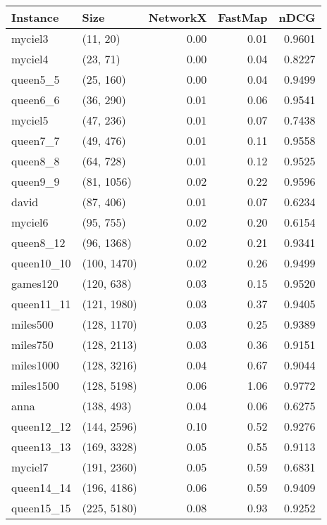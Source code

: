 \begin{tabular}{llrrr}
\toprule
  Instance &         Size &  NetworkX &  FastMap &   nDCG \\
\midrule
   myciel3 &     (11, 20) &      0.00 &     0.01 & 0.9601 \\
   myciel4 &     (23, 71) &      0.00 &     0.04 & 0.8227 \\
  queen5\_5 &    (25, 160) &      0.00 &     0.04 & 0.9499 \\
  queen6\_6 &    (36, 290) &      0.01 &     0.06 & 0.9541 \\
   myciel5 &    (47, 236) &      0.01 &     0.07 & 0.7438 \\
  queen7\_7 &    (49, 476) &      0.01 &     0.11 & 0.9558 \\
  queen8\_8 &    (64, 728) &      0.01 &     0.12 & 0.9525 \\
  queen9\_9 &   (81, 1056) &      0.02 &     0.22 & 0.9596 \\
     david &    (87, 406) &      0.01 &     0.07 & 0.6234 \\
   myciel6 &    (95, 755) &      0.02 &     0.20 & 0.6154 \\
 queen8\_12 &   (96, 1368) &      0.02 &     0.21 & 0.9341 \\
queen10\_10 &  (100, 1470) &      0.02 &     0.26 & 0.9499 \\
  games120 &   (120, 638) &      0.03 &     0.15 & 0.9520 \\
queen11\_11 &  (121, 1980) &      0.03 &     0.37 & 0.9405 \\
  miles500 &  (128, 1170) &      0.03 &     0.25 & 0.9389 \\
  miles750 &  (128, 2113) &      0.03 &     0.36 & 0.9151 \\
 miles1000 &  (128, 3216) &      0.04 &     0.67 & 0.9044 \\
 miles1500 &  (128, 5198) &      0.06 &     1.06 & 0.9772 \\
      anna &   (138, 493) &      0.04 &     0.06 & 0.6275 \\
queen12\_12 &  (144, 2596) &      0.10 &     0.52 & 0.9276 \\
queen13\_13 &  (169, 3328) &      0.05 &     0.55 & 0.9113 \\
   myciel7 &  (191, 2360) &      0.05 &     0.59 & 0.6831 \\
queen14\_14 &  (196, 4186) &      0.06 &     0.59 & 0.9409 \\
queen15\_15 &  (225, 5180) &      0.08 &     0.93 & 0.9252 \\

\end{tabular}
